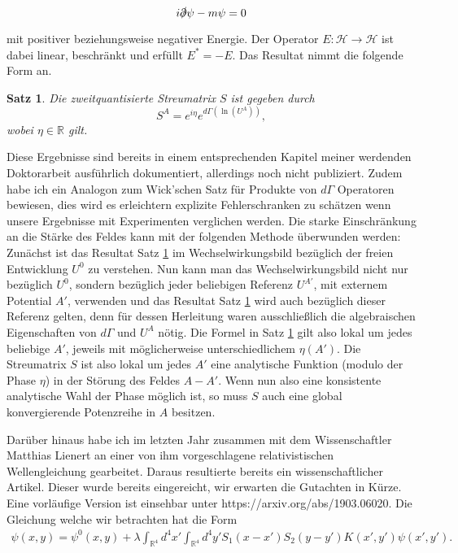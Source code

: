 \documentclass[a4paper,12pt]{article}
\newtheorem{satz}{Satz}
\begin{document}
\begin{equation}\label{diraceq}
i \slashed{\partial}\psi - m \psi = 0
\end{equation}

mit positiver beziehungsweise negativer Energie. Der Operator \(E:\mathcal{H}\rightarrow\mathcal{H}\) ist dabei linear, beschränkt und erfüllt \(E^*=-E\). Das Resultat nimmt die folgende Form an.

\begin{satz}\label{Explizite Formel}
Die zweitquantisierte Streumatrix \(S\) ist gegeben durch
\begin{equation}\label{Smatrix}
S^A= e^{i \eta} e^{d\Gamma(\ln (U^A))},
\end{equation}
wobei \(\eta\in \mathbb{R}\) gilt.
\end{satz}


Diese Ergebnisse sind bereits in einem entsprechenden Kapitel meiner werdenden Doktorarbeit
 ausführlich dokumentiert, allerdings noch nicht publiziert.
Zudem habe ich ein Analogon zum Wick'schen Satz für Produkte von \(d\Gamma\) Operatoren bewiesen, dies
wird es erleichtern explizite Fehlerschranken zu schätzen wenn unsere Ergebnisse mit Experimenten
verglichen werden. Die starke Einschränkung an die Stärke des Feldes kann mit der folgenden Methode 
überwunden werden: Zunächst ist das Resultat Satz \ref{Explizite Formel} im Wechselwirkungsbild bezüglich
der freien Entwicklung \(U^0\) zu verstehen.
Nun kann man das Wechselwirkungsbild nicht nur bezüglich \(U^0\), sondern bezüglich jeder beliebigen 
Referenz \(U^{A'}\), mit externem Potential \(A'\), verwenden und das Resultat Satz \ref{Explizite Formel}
wird auch bezüglich dieser Referenz gelten, denn für dessen Herleitung waren ausschließlich die
algebraischen Eigenschaften von \(d\Gamma\) und \(U^A\) nötig. Die Formel in Satz \ref{Explizite Formel} gilt also
lokal um jedes beliebige \(A'\), jeweils mit möglicherweise unterschiedlichem \(\eta(A')\). Die Streumatrix \(S\)
ist also lokal um jedes \(A'\) eine analytische Funktion (modulo der Phase \(\eta\)) in der Störung des Feldes \(A-A'\). 
Wenn nun also eine konsistente
analytische Wahl der Phase möglich ist, so muss \(S\) auch eine global konvergierende Potenzreihe in \(A\) besitzen.




Darüber hinaus habe ich im letzten Jahr zusammen mit dem Wissenschaftler Matthias Lienert an einer von ihm vorgeschlagene
relativistischen Wellengleichung gearbeitet. Daraus resultierte bereits ein wissenschaftlicher Artikel. Dieser wurde bereits eingereicht,
wir erwarten die Gutachten in Kürze. Eine vorläufige Version ist einsehbar unter https://arxiv.org/abs/1903.06020. 
Die Gleichung welche wir betrachten hat die Form 
\begin{align}
\psi(x,y)=\psi^0(x,y) + \lambda \int_{\mathbb{R}^4} d^4 x' \int_{\mathbb{R}^4} d^4y' S_1(x-x')S_2(y-y') K(x',y') \psi(x',y').
\end{align}
\end{document}

